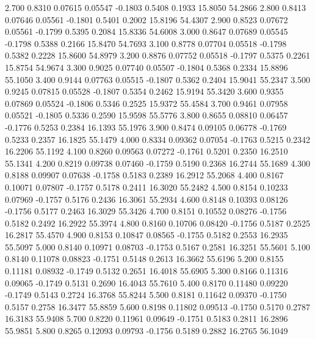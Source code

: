    2.700   0.8310   0.07615   0.05547  -0.1803   0.5408   0.1933  15.8050  54.2866
   2.800   0.8413   0.07646   0.05561  -0.1801   0.5401   0.2002  15.8196  54.4307
   2.900   0.8523   0.07672   0.05561  -0.1799   0.5395   0.2084  15.8336  54.6008
   3.000   0.8647   0.07689   0.05545  -0.1798   0.5388   0.2166  15.8470  54.7693
   3.100   0.8778   0.07704   0.05518  -0.1798   0.5382   0.2228  15.8600  54.8979
   3.200   0.8876   0.07752   0.05518  -0.1797   0.5375   0.2261  15.8754  54.9674
   3.300   0.9025   0.07740   0.05507  -0.1804   0.5368   0.2334  15.8896  55.1050
   3.400   0.9144   0.07763   0.05515  -0.1807   0.5362   0.2404  15.9041  55.2347
   3.500   0.9245   0.07815   0.05528  -0.1807   0.5354   0.2462  15.9194  55.3420
   3.600   0.9355   0.07869   0.05524  -0.1806   0.5346   0.2525  15.9372  55.4584
   3.700   0.9461   0.07958   0.05521  -0.1805   0.5336   0.2590  15.9598  55.5776
   3.800   0.8655   0.08810   0.06457  -0.1776   0.5253   0.2384  16.1393  55.1976
   3.900   0.8474   0.09105   0.06778  -0.1769   0.5233   0.2357  16.1825  55.1479
   4.000   0.8334   0.09362   0.07054  -0.1763   0.5215   0.2342  16.2206  55.1192
   4.100   0.8260   0.09563   0.07272  -0.1761   0.5201   0.2350  16.2510  55.1341
   4.200   0.8219   0.09738   0.07460  -0.1759   0.5190   0.2368  16.2744  55.1689
   4.300   0.8188   0.09907   0.07638  -0.1758   0.5183   0.2389  16.2912  55.2068
   4.400   0.8167   0.10071   0.07807  -0.1757   0.5178   0.2411  16.3020  55.2482
   4.500   0.8154   0.10233   0.07969  -0.1757   0.5176   0.2436  16.3061  55.2934
   4.600   0.8148   0.10393   0.08126  -0.1756   0.5177   0.2463  16.3029  55.3426
   4.700   0.8151   0.10552   0.08276  -0.1756   0.5182   0.2492  16.2922  55.3974
   4.800   0.8160   0.10706   0.08420  -0.1756   0.5187   0.2525  16.2817  55.4570
   4.900   0.8153   0.10847   0.08565  -0.1755   0.5182   0.2553  16.2935  55.5097
   5.000   0.8140   0.10971   0.08703  -0.1753   0.5167   0.2581  16.3251  55.5601
   5.100   0.8140   0.11078   0.08823  -0.1751   0.5148   0.2613  16.3662  55.6196
   5.200   0.8155   0.11181   0.08932  -0.1749   0.5132   0.2651  16.4018  55.6905
   5.300   0.8166   0.11316   0.09065  -0.1749   0.5131   0.2690  16.4043  55.7610
   5.400   0.8170   0.11480   0.09220  -0.1749   0.5143   0.2724  16.3768  55.8244
   5.500   0.8181   0.11642   0.09370  -0.1750   0.5157   0.2758  16.3477  55.8859
   5.600   0.8198   0.11802   0.09513  -0.1750   0.5170   0.2787  16.3183  55.9408
   5.700   0.8220   0.11961   0.09649  -0.1751   0.5183   0.2811  16.2896  55.9851
   5.800   0.8265   0.12093   0.09793  -0.1756   0.5189   0.2882  16.2765  56.1049
